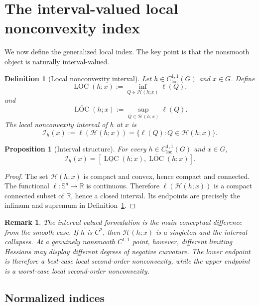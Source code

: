 \documentclass[11pt]{article}
\numberwithin{equation}{section}
\newtheorem{proposition}[theorem]{Proposition}
\newtheorem{definition}[theorem]{Definition}
\newtheorem{remark}[theorem]{Remark}
\newcommand{\R}{\mathbb R}
\newcommand{\Sd}{\mathbb S^d}
\newcommand{\Hess}{\mathcal H}
\newcommand{\LOC}{\operatorname{LOC}}
\begin{document}
	\section{The interval-valued local nonconvexity index}
	
	We now define the generalized local index. The key point is that the nonsmooth object is naturally interval-valued.
	
	\begin{definition}[Local nonconvexity interval]
		\label{def:interval-index}
		Let \(h\in C^{1,1}_{\mathrm{loc}}(G)\) and \(x\in G\). Define
		\[
		\underline{\LOC}(h;x)
		:=
		\inf_{Q\in\Hess(h;x)} \ell(Q),
		\]
		and
		\[
		\overline{\LOC}(h;x)
		:=
		\sup_{Q\in\Hess(h;x)} \ell(Q).
		\]
		The local nonconvexity interval of \(h\) at \(x\) is
		\[
		\mathcal I_h(x)
		:=
		\ell(\Hess(h;x))
		=
		\{\ell(Q):Q\in\Hess(h;x)\}.
		\]
	\end{definition}
	
	\begin{proposition}[Interval structure]
		\label{prop:interval}
		For every \(h\in C^{1,1}_{\mathrm{loc}}(G)\) and \(x\in G\),
		\[
		\mathcal I_h(x)
		=
		\left[
		\underline{\LOC}(h;x),
		\overline{\LOC}(h;x)
		\right].
		\]
	\end{proposition}
	
	\begin{proof}
		The set \(\Hess(h;x)\) is compact and convex, hence compact and connected. The functional \(\ell:\Sd\to\R\) is continuous. Therefore \(\ell(\Hess(h;x))\) is a compact connected subset of \(\R\), hence a closed interval. Its endpoints are precisely the infimum and supremum in Definition~\ref{def:interval-index}.
	\end{proof}
	
	\begin{remark}
		The interval-valued formulation is the main conceptual difference from the smooth case. If \(h\) is \(C^2\), then \(\Hess(h;x)\) is a singleton and the interval collapses. At a genuinely nonsmooth \(C^{1,1}\) point, however, different limiting Hessians may display different degrees of negative curvature. The lower endpoint is therefore a best-case local second-order nonconvexity, while the upper endpoint is a worst-case local second-order nonconvexity.
	\end{remark}
	
	\subsection{Normalized indices}
	
\end{document}
